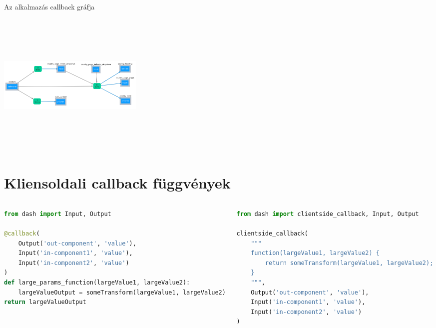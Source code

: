 \documentclass[english, aspectratio=169]{beamer}
\makeatletter
\let\origtableofcontents=\tableofcontents
\def\tableofcontents{\@ifnextchar[{\origtableofcontents}{\gobbletableofcontents}}
\def\gobbletableofcontents#1{\origtableofcontents}
\makeatother
\begin{document}
\begin{frame}[fragile]{Az alkalmazás callback gráfja}
	\begin{center}
		\includegraphics[width=7cm, height=7cm, keepaspectratio]{images/adv_8.png}
	\end{center}
\end{frame}

\section{Kliensoldali callback függvények}

\begin{frame}{}
	\tableofcontents[currentsection]
\end{frame}

\begin{frame}[fragile]{}  %
	\begin{columns}
		\begin{column}{.5\textwidth}
			\begin{lstlisting}[language=python]
from dash import Input, Output

@callback(
	Output('out-component', 'value'),
	Input('in-component1', 'value'),
	Input('in-component2', 'value')
)
def large_params_function(largeValue1, largeValue2):
	largeValueOutput = someTransform(largeValue1, largeValue2)
return largeValueOutput	
			\end{lstlisting}
		\end{column}
		\begin{column}{.5\textwidth}
			\begin{lstlisting}[language=python]
from dash import clientside_callback, Input, Output

clientside_callback(
	"""
	function(largeValue1, largeValue2) {
		return someTransform(largeValue1, largeValue2);
	}
	""",
	Output('out-component', 'value'),
	Input('in-component1', 'value'),
	Input('in-component2', 'value')
)
			\end{lstlisting}
		\end{column}
	\end{columns}
\end{frame}
\end{document}

